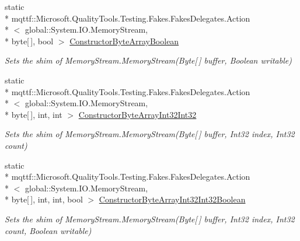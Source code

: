 \begin{DoxyCompactItemize}
static \\*
mqttf\-::\-Microsoft.\-Quality\-Tools.\-Testing.\-Fakes.\-Fakes\-Delegates.\-Action\\*
$<$ global\-::\-System.\-I\-O.\-Memory\-Stream, \\*
byte\mbox{[}$\,$\mbox{]}, bool $>$ \hyperlink{class_system_1_1_i_o_1_1_fakes_1_1_shim_memory_stream_a96787ae0f69121cbe7b1ed0a0b154cd7}{Constructor\-Byte\-Array\-Boolean}
\begin{DoxyCompactList}\small\item\em Sets the shim of Memory\-Stream.\-Memory\-Stream(\-Byte\mbox{[}$\,$\mbox{]} buffer, Boolean writable)\end{DoxyCompactList}\item 
static \\*
mqttf\-::\-Microsoft.\-Quality\-Tools.\-Testing.\-Fakes.\-Fakes\-Delegates.\-Action\\*
$<$ global\-::\-System.\-I\-O.\-Memory\-Stream, \\*
byte\mbox{[}$\,$\mbox{]}, int, int $>$ \hyperlink{class_system_1_1_i_o_1_1_fakes_1_1_shim_memory_stream_a5130817d46b3623f02a7dbac8ae6f258}{Constructor\-Byte\-Array\-Int32\-Int32}
\begin{DoxyCompactList}\small\item\em Sets the shim of Memory\-Stream.\-Memory\-Stream(\-Byte\mbox{[}$\,$\mbox{]} buffer, Int32 index, Int32 count)\end{DoxyCompactList}\item 
static \\*
mqttf\-::\-Microsoft.\-Quality\-Tools.\-Testing.\-Fakes.\-Fakes\-Delegates.\-Action\\*
$<$ global\-::\-System.\-I\-O.\-Memory\-Stream, \\*
byte\mbox{[}$\,$\mbox{]}, int, int, bool $>$ \hyperlink{class_system_1_1_i_o_1_1_fakes_1_1_shim_memory_stream_ad11098fcac68358e11d689f4645f73a3}{Constructor\-Byte\-Array\-Int32\-Int32\-Boolean}
\begin{DoxyCompactList}\small\item\em Sets the shim of Memory\-Stream.\-Memory\-Stream(\-Byte\mbox{[}$\,$\mbox{]} buffer, Int32 index, Int32 count, Boolean writable)\end{DoxyCompactList}\item 

\end{DoxyCompactItemize}
